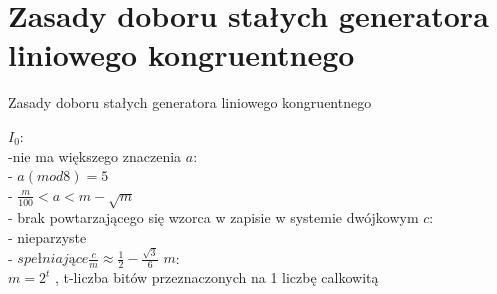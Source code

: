 ﻿\section{Zasady doboru stałych generatora liniowego kongruentnego}
	\begin{frame}{Zasady doboru stałych generatora liniowego kongruentnego}
    
 	 $I_{0}$: \\
 	 -nie ma większego znaczenia 
	\newline \newline
	$a$: \\
	- $a(mod 8)=5$ \\
	- $\frac{m}{100}<a<m-\sqrt{m}$ \\
	- brak powtarzającego się wzorca w zapisie w systemie dwójkowym
	\newline \newline
	$c$: \\
	- nieparzyste \\
 	- $spełniające \frac{c}{m}\approx\frac{1}{2}-\frac{\sqrt{3}}{6}$
	\newline \newline
	$m$: \\
	$m=2^{t}$ , \quad t-liczba bitów przeznaczonych na 1 liczbę calkowitą
	

	\end{frame}
